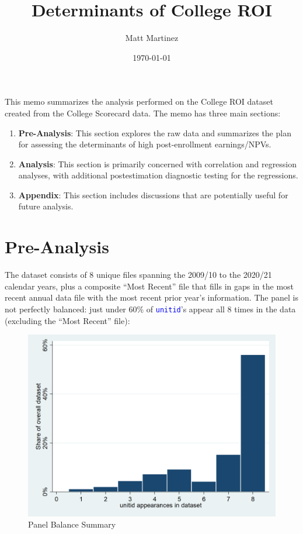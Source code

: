 \documentclass[12pt]{article}
\numberwithin{equation}{section}
\newcommand{\Varnm}[1]{\texttt{\textcolor{Blue}{#1}}}
\begin{document}
\title{ \vspace{-1.2cm} Determinants of College ROI}
\author{Matt Martinez}
\date{\today}
\maketitle{}
This memo summarizes the analysis performed on the College ROI dataset created from the College Scorecard data. The memo has three main sections:
\begin{enumerate}
\item \textbf{Pre-Analysis}: This section explores the raw data and summarizes the plan for assessing the determinants of high post-enrollment earnings/NPVs. 
\item \textbf{Analysis}: This section is primarily concerned with correlation and regression analyses, with additional postestimation diagnostic testing for the regressions.
\item \textbf{Appendix}: This section includes discussions that are potentially useful for future analysis.
\end{enumerate} 
\section{Pre-Analysis}

The dataset consists of 8 unique files spanning the 2009/10 to the 2020/21 calendar years, plus a composite \enquote{Most Recent} file that fills in gaps in the most recent annual data file with the most recent prior year's information. The panel is not perfectly balanced: just under 60\% of \Varnm{unitid}'s appear all 8 times in the data (excluding the \enquote{Most Recent} file):
\begin{figure}[h!]
\caption{Panel Balance Summary}
\includegraphics[width=5.08in]{panel_balance_summary.png}
\centering
\end{figure}
\end{document}
